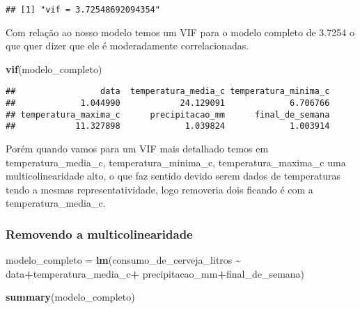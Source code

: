 \documentclass[
]{article}
\newenvironment{Shaded}{\begin{snugshade}}{\end{snugshade}}
\newcommand{\FunctionTok}[1]{\textcolor[rgb]{0.13,0.29,0.53}{\textbf{#1}}}
\newcommand{\NormalTok}[1]{#1}
\newcommand{\OtherTok}[1]{\textcolor[rgb]{0.56,0.35,0.01}{#1}}
\newcommand{\SpecialCharTok}[1]{\textcolor[rgb]{0.81,0.36,0.00}{\textbf{#1}}}
\begin{document}
\begin{verbatim}
## [1] "vif = 3.72548692094354"
\end{verbatim}

Com relação ao nosso modelo temos um VIF para o modelo completo de
3.7254 o que quer dizer que ele é moderadamente correlacionadas.

\begin{Shaded}
\begin{Highlighting}[]
\FunctionTok{vif}\NormalTok{(modelo\_completo)}
\end{Highlighting}
\end{Shaded}

\begin{verbatim}
##                 data  temperatura_media_c temperatura_minima_c 
##             1.044990            24.129091             6.706766 
## temperatura_maxima_c      precipitacao_mm      final_de_semana 
##            11.327898             1.039824             1.003914
\end{verbatim}

Porém quando vamos para um VIF mais detalhado temos em
temperatura\_media\_c, temperatura\_minima\_c, temperatura\_maxima\_c
uma multicolinearidade alto, o que faz sentido devido serem dados de
temperaturas tendo a mesmas representatividade, logo removeria dois
ficando é com a temperatura\_media\_c.

\hypertarget{removendo-a-multicolinearidade}{%
\subsubsection{Removendo a
multicolinearidade}\label{removendo-a-multicolinearidade}}

\begin{Shaded}
\begin{Highlighting}[]
\NormalTok{modelo\_completo }\OtherTok{=} \FunctionTok{lm}\NormalTok{(consumo\_de\_cerveja\_litros }\SpecialCharTok{\textasciitilde{}}\NormalTok{ data}\SpecialCharTok{+}\NormalTok{temperatura\_media\_c}\SpecialCharTok{+}
\NormalTok{                       precipitacao\_mm}\SpecialCharTok{+}\NormalTok{final\_de\_semana)}

\FunctionTok{summary}\NormalTok{(modelo\_completo)}
\end{Highlighting}
\end{Shaded}
\end{document}

